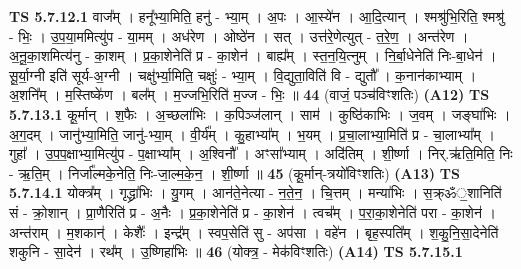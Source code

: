 \documentclass[17pt]{extarticle}
\begin{document}
                                \textbf{ TS 5.7.12.1} \newline
                  वाज᳚म् । हनू᳚भ्या॒मिति॒ हनु॑ - भ्या॒म् । अ॒पः । आ॒स्ये॑न । आ॒दि॒त्यान् । श्मश्रु॑भि॒रिति॒ श्मश्रु॑ - भिः॒ । उ॒प॒या॒ममित्यु॑प - या॒मम् । अध॑रेण । ओष्ठे॑न । सत् । उत्त॑रे॒णेत्युत् - त॒रे॒ण॒ । अन्त॑रेण । अ॒नू॒का॒शमित्य॑नु - का॒शम् । प्र॒का॒शेनेति॑ प्र - का॒शेन॑ । बाह्य᳚म् । स्त॒न॒यि॒त्नुम् । नि॒र्बा॒धेनेति॑ निः-बा॒धेन॑ । सू॒र्या॒ग्नी इति॑ सूर्य-अ॒ग्नी । चक्षु॑र्भ्या॒मिति॒ चक्षुः॑ - भ्या॒म् । वि॒द्युता॒विति॑ वि - द्युतौ᳚ । क॒नान॑काभ्याम् । अ॒शनि᳚म् । म॒स्तिष्के॑ण । बल᳚म् । म॒ज्जभि॒रिति॑ म॒ज्ज - भिः॒ ॥ \textbf{  44 } \newline
                  \newline
                      (वाजं॒ पञ्च॑विꣳशतिः)  \textbf{(A12)} \newline \newline
                                \textbf{ TS 5.7.13.1} \newline
                  कू॒र्मान् । श॒फैः । अ॒च्छला॑भिः । क॒पिञ्ज॑लान् । साम॑ । कुष्ठि॑काभिः । ज॒वम् । जङ्घा॑भिः । अ॒ग॒दम् । जानु॑भ्या॒मिति॒ जानु॑-भ्या॒म् । वी॒र्य᳚म् । कु॒हाभ्या᳚म् । भ॒यम् । प्र॒चा॒लाभ्या॒मिति॑ प्र - चा॒लाभ्या᳚म् । गुहा᳚ । उ॒प॒प॒क्षाभ्या॒मित्यु॑प - प॒क्षाभ्या᳚म् । अ॒श्विनौ᳚ । अꣳसा᳚भ्याम् । अदि॑तिम् । शी॒र्ष्णा । निर्.ऋ॑ति॒मिति॒ निः - ऋ॒ति॒म् । निर्जा᳚ल्मके॒नेति॒ निः-जा॒ल्म॒के॒न॒ । शी॒र्ष्णा ॥ \textbf{  45 } \newline
                  \newline
                      (कू॒र्मान्-त्रयो॑विꣳशतिः)  \textbf{(A13)} \newline \newline
                                \textbf{ TS 5.7.14.1} \newline
                  योक्त्र᳚म् । गृद्ध्रा॑भिः । यु॒गम् । आन॑ते॒नेत्या - न॒ते॒न॒ । चि॒त्तम् । मन्या॑भिः । स॒क्र्ॐ॒शानिति॑ सं - क्रो॒शान् । प्रा॒णैरिति॑ प्र - अ॒नैः । प्र॒का॒शेनेति॑ प्र - का॒शेन॑ । त्वच᳚म् । प॒रा॒का॒शेनेति॑ परा - का॒शेन॑ । अन्त॑राम् । म॒शकान्॑ । केशैः᳚ । इन्द्र᳚म् । स्वप॒सेति॑ सु - अप॑सा । वहे॑न । बृह॒स्पति᳚म् । श॒कु॒नि॒सा॒देनेति॑ शकुनि - सा॒देन॑ । रथ᳚म् । उ॒ष्णिहा॑भिः ॥ \textbf{  46} \newline
                  \newline
                      (योक्त्र॒ - मेक॑विꣳशतिः)  \textbf{(A14)} \newline \newline
                                \textbf{ TS 5.7.15.1} \newline
\end{document}
